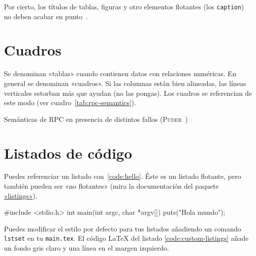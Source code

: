 Por cierto, los títulos de tablas, figuras y otro elementos flotantes (los
\texttt{caption}) no deben acabar en punto~\cite{sousa}.


\section{Cuadros}
\label{sec:uncuadro}

Se denominan «tablas» cuando contienen datos con relaciones numéricas. En
general se denominan «cuadros». Si las columnas están bien alineadas, las líneas
verticales estorban más que ayudan (no las pongas). Los cuadros se referencian
de este modo (ver cuadro~\ref{tab:rpc-semantics}).

\begin{table}[hp]
  \centering
  {\small
  
  }
  \caption[Semánticas de \acs{RPC} en presencia de distintos fallos]
  {Semánticas de \acs{RPC} en presencia de distintos fallos
    (\textsc{Puder}~\cite{puder05:_distr_system_archit})}
  \label{tab:rpc-semantics}
\end{table}


\section{Listados de código}
\label{sec:listado}

Puedes referenciar un listado con~\ref{code:hello}. Éste es un listado flotante,
pero también pueden ser «no flotantes» (mira la documentación del paquete
\href{http://www.ctan.org/get/macros/latex/contrib/listings/listings.pdf}{«listings»}).

\begin{listing}[
  float=ht,
  language = C,
  caption  = {«Hola mundo» en C},
  label    = code:hello]
#include <stdio.h>
int main(int argc, char *argv[]) {
    puts("Hola mundo\n");
}
\end{listing}

Puedes modificar el estilo por defecto para tus listados añadiendo un comando
\texttt{lstset} en tu \texttt{main.tex}. El código LaTeX del listado \ref{code:custom-listings}
añade un fondo gris claro y una línea en el margen izquierdo.

\begin{listing}[
  float=h!,
  caption  = {Personalizando los listados de código},
  label    = code:custom-listings]
\end{listing}



